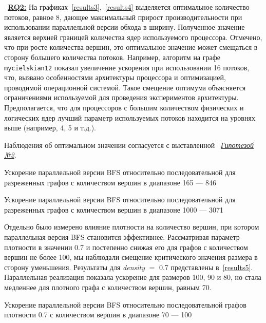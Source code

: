 ~\hyperref[rq2]{\textbf{RQ2:}}
На графиках~\ref{results3},~\ref{results4} выделяется оптимальное количество потоков, равное 8, дающее максимальный прирост производительности при использовании параллельной версии обхода в ширину. Полученное значение является верхней границей количества ядер используемого процессора. Отмечено, что при росте количества вершин, это оптимальное значение может смещаться в сторону большего количества потоков. Например, алгоритм на графе \texttt{mycielskian12} показал увеличение ускорения при использовании 16 потоков, что, вызвано особенностями архитектуры процессора и оптимизацией, проводимой операционной системой. Такое смещение оптимума объясняется ограничениями используемой для проведения экспериментов архитектуры. Предполагается, что для процессоров с большим количеством физических и логических ядер лучший параметр используемых потоков находится на уровнях выше (например, 4, 5 и т.д.). 

Наблюдения об оптимальном значении согласуется с выставленной ~\hyperref[t2]{\textit{Гипотезой №2}}.
\newline

\begin{table}
  \centering

\caption{Ускорение параллельной версии BFS относительно последовательной для разреженных графов с количеством вершин в диапазоне 165 --- 846}
\label{results3}
\end{table}

\begin{table}
  \centering

\caption{Ускорение параллельной версии BFS относительно последовательной для разреженных графов с количеством вершин в диапазоне 1000 --- 3071}
\label{results4}
\end{table}

Отдельно было измерено влияние плотности на количество вершин, при котором параллельная версия BFS становится эффективнее. Рассматривая параметр плотности в значении 0.7 и постепенно снижая его для графов с количеством вершин не более 100, мы наблюдали смещение критического значения размера в сторону уменьшения. Результаты для \textit{density} $=$ 0.7 представлены в~\ref{results5}. Параллельная реализация показала ускорение для размеров 100, 90 и 80, но стала медленнее для плотного графа с количеством вершин, равным 70.

\begin{table}
  \centering

\caption{Ускорение параллельной версии BFS относительно последовательной графов плотности 0.7 с количеством вершин в диапазоне 70 --- 100}
\label{results5}
\end{table}

